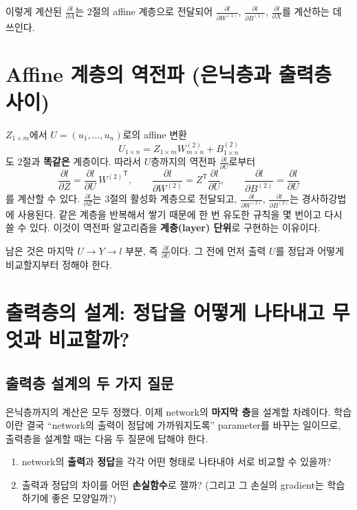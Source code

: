 \documentclass[11pt,a4paper]{article}
\newcommand{\T}{^{\mathsf T}}
\newcommand{\pd}[2]{\frac{\partial #1}{\partial #2}}
\begin{document}
이렇게 계산된 $\pd{l}{A}$는 2절의 affine 계층으로 전달되어
$\pd{l}{W^{(1)}}$, $\pd{l}{B^{(1)}}$, $\pd{l}{X}$를 계산하는 데 쓰인다.

\section{Affine 계층의 역전파 (은닉층과 출력층 사이)}

$Z_{1\times m}$에서 $U=(u_1,\ldots,u_n)$로의 affine 변환
\[
U_{1\times n}=Z_{1\times m}W^{(2)}_{m\times n}+B^{(2)}_{1\times n}
\]
도 2절과 \textbf{똑같은} 계층이다. 따라서 $U$층까지의 역전파 $\pd{l}{U}$로부터
\[
\pd{l}{Z}=\pd{l}{U}\,{W^{(2)}}\T,
\qquad
\pd{l}{W^{(2)}}=Z\T\pd{l}{U},
\qquad
\pd{l}{B^{(2)}}=\pd{l}{U}
\]
를 계산할 수 있다.
$\pd{l}{Z}$는 3절의 활성화 계층으로 전달되고,
$\pd{l}{W^{(2)}}$, $\pd{l}{B^{(2)}}$는 경사하강법에 사용된다.
같은 계층을 반복해서 쌓기 때문에 한 번 유도한 규칙을 몇 번이고 다시 쓸 수 있다.
이것이 역전파 알고리즘을 \textbf{계층(layer) 단위}로 구현하는 이유이다.

남은 것은 마지막 $U\to Y\to l$ 부분, 즉 $\pd{l}{U}$이다.
그 전에 먼저 출력 $U$를 정답과 어떻게 비교할지부터 정해야 한다.

\section{출력층의 설계: 정답을 어떻게 나타내고 무엇과 비교할까?}\label{sec:onehot}

\subsection{출력층 설계의 두 가지 질문}

은닉층까지의 계산은 모두 정했다. 이제 network의 \textbf{마지막 층}을 설계할 차례이다.
학습이란 결국 ``network의 출력이 정답에 가까워지도록'' parameter를 바꾸는 일이므로,
출력층을 설계할 때는 다음 두 질문에 답해야 한다.

\begin{keybox}
\begin{enumerate}[label=\textbf{Q\arabic*.},leftmargin=2.6em]
\item network의 \textbf{출력}과 \textbf{정답}을 각각 어떤 형태로 나타내야 서로 비교할 수 있을까?
\item 출력과 정답의 차이를 어떤 \textbf{손실함수}로 잴까?
(그리고 그 손실의 gradient는 학습하기에 좋은 모양일까?)
\end{enumerate}
\end{keybox}
\end{document}
